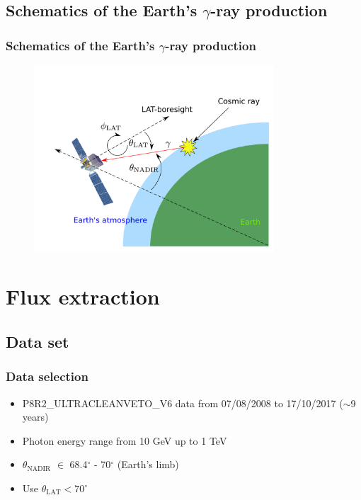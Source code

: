 \documentclass{beamer}
\begin{document}
\subsection{Schematics of the Earth's $\gamma$-ray production}
\begin{frame}
\frametitle{Schematics of the Earth's $\gamma$-ray production}
\centering
\begin{figure}[h!]
\includegraphics[width = 0.8\textwidth]{lat_production_schematic}
\end{figure}
\end{frame}


\section{Flux extraction}
\subsection{Data set}

\begin{frame}
\frametitle{Data selection}
\begin{itemize}
  \item P8R2\_ULTRACLEANVETO\_V6 data from 07/08/2008 to 17/10/2017 ($\sim$9 years) %
  \item Photon energy range from 10 GeV up to 1 TeV
  \item $\theta_{\text{NADIR}}$ $\in$ 68.4$^\circ$  - 70$^\circ$ (Earth's limb)
  \item Use $\theta_{\text{LAT}} < 70^\circ$
\end{itemize}
\end{frame}
\end{document}
